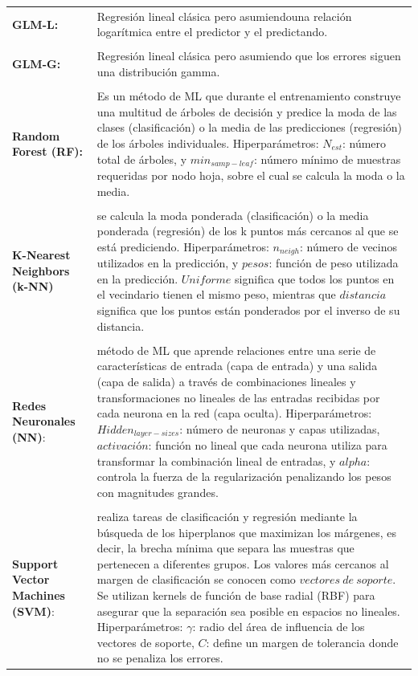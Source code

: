 \documentclass[12pt]{article}
\begin{document}
\begin{table}
\centering
\begin{tabular}{|p{2.0cm}|p{14.0cm}| }
\hline
    \textbf{GLM-L:}& Regresión lineal clásica pero asumiendo\newline  una relación logarítmica entre el predictor y el predictando.\\
    &\\
    \textbf{GLM-G:}& Regresión lineal clásica pero asumiendo que los errores siguen una distribución gamma. \\
    &\\
    \textbf{Random Forest (RF):} & Es un método de ML que durante el entrenamiento construye una multitud de árboles de decisión  y predice la moda de las clases (clasificación) o la media de las predicciones (regresión) de los árboles individuales. Hiperparámetros: $N_{est}$: número total de árboles, y $min_{samp-leaf}$: número mínimo de muestras requeridas por nodo hoja, sobre el cual se calcula la moda o la media. \\
    &\\
    \textbf{K-Nearest Neighbors (k-NN)}  &se calcula la moda ponderada (clasificación) o la media ponderada (regresión) de los k puntos más cercanos al que se está prediciendo. Hiperparámetros: $n_{neigh}$: número de vecinos utilizados en la predicción, y $pesos$: función de peso utilizada en la predicción. $Uniforme$ significa que todos los puntos en el vecindario tienen el mismo peso, mientras que $distancia$ significa que los puntos están ponderados por el inverso de su distancia.\\
    &\\
    \textbf{Redes Neuronales (NN)}: &método de ML que aprende relaciones entre una serie de características de entrada (capa de entrada) y una salida (capa de salida) a través de combinaciones lineales y transformaciones no lineales de las entradas recibidas por cada neurona en la red (capa oculta). Hiperparámetros: $Hidden_{layer-sizes}$: número de neuronas y capas utilizadas, $activación$: función no lineal que cada neurona utiliza para transformar la combinación lineal de entradas, y $alpha$: controla la fuerza de la regularización penalizando los pesos con magnitudes grandes.\\
    &\\
    \textbf{Support Vector Machines (SVM)}: & realiza tareas de clasificación y regresión mediante la búsqueda de los hiperplanos que maximizan los márgenes, es decir, la brecha mínima que separa las muestras que pertenecen a diferentes grupos. Los valores más cercanos al margen de clasificación se conocen como $vectores~de~soporte$. Se utilizan kernels de función de base radial (RBF) para asegurar que la separación sea posible en espacios no lineales. Hiperparámetros: $\gamma$: radio del área de influencia de los vectores de soporte, $C$: define un margen de tolerancia donde no se penaliza los errores. \\

\end{tabular}
\end{table}
\end{document}
